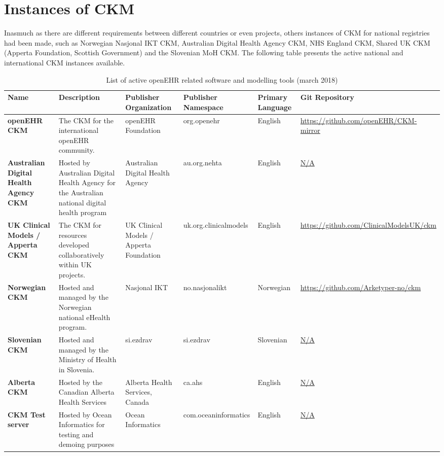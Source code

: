 \documentclass[mim_thesis.tex]{subfiles}
\begin{document}
\section{Instances of CKM}
Inasmuch as there are different requirements between different countries or even projects, others instances of CKM for national registries had been made, such as Norwegian Nasjonal IKT CKM, Australian Digital Health Agency CKM, NHS England CKM, Shared UK CKM (Apperta Foundation, Scottish Government) and the Slovenian MoH CKM. The following table presents the active national and international CKM instances available.

\begin{table}[H]
\centering
\caption{ List of active openEHR related software and modelling tools (march 2018)}
\label{tab:tools}
\begin{tabular}{p{1.5cm} p{3cm} p{2cm} p{3cm} p{1.7cm} p{3cm}}
\toprule[2pt]
\textbf{Name} & \textbf{Description} & \textbf{Publisher Organization} & \textbf{Publisher Namespace} & \textbf{Primary Language}  & \textbf{Git Repository}                                                         \\ \midrule[2pt]
\textbf{openEHR CKM}  & The CKM for the international openEHR community. & openEHR Foundation  & org.openehr & English & \url{https://github.com/openEHR/CKM-mirror}                                                       \\ \midrule
\textbf{Australian Digital Health Agency CKM} & Hosted by Australian Digital Health Agency for the Australian national digital health program & Australian Digital Health Agency & au.org.nehta & English &\url{N/A} \\ \midrule
\textbf{UK Clinical Models / Apperta CKM} & The CKM for resources developed collaboratively within UK projects. & UK Clinical Models / Apperta Foundation & uk.org.clinicalmodels & English & \url{https://github.com/ClinicalModelsUK/ckm}       
\\ \midrule
\textbf{Norwegian CKM} & Hosted and managed by the Norwegian national eHealth program.                        & Nasjonal IKT & no.nasjonalikt & Norwegian & \url{https://github.com/Arketyper-no/ckm}      
\\ \midrule
\textbf{Slovenian CKM} & Hosted and managed by the Ministry of Health in Slovenia. & si.ezdrav & si.ezdrav & Slovenian & \url{N/A}                                                         
\\ \midrule
\textbf{Alberta CKM} & Hosted by the Canadian Alberta Health Services  & Alberta Health Services, Canada  & ca.ahs & English & \url{N/A}                                           
\\ \midrule
\textbf{CKM Test server}  & Hosted by Ocean Informatics for testing and demoing purposes & Ocean Informatics  & com.oceaninformatics & English & \url{N/A}                           
\\ \bottomrule[2pt]
\end{tabular}
\end{table}
\end{document}
